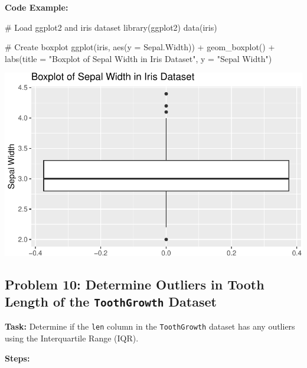 \documentclass[
  letterpaper,
  DIV=11,
  numbers=noendperiod]{scrreprt}
\newenvironment{Shaded}{\begin{snugshade}}{\end{snugshade}}
\newcommand{\AttributeTok}[1]{\textcolor[rgb]{0.40,0.45,0.13}{#1}}
\newcommand{\CommentTok}[1]{\textcolor[rgb]{0.37,0.37,0.37}{#1}}
\newcommand{\FunctionTok}[1]{\textcolor[rgb]{0.28,0.35,0.67}{#1}}
\newcommand{\NormalTok}[1]{\textcolor[rgb]{0.00,0.23,0.31}{#1}}
\newcommand{\SpecialCharTok}[1]{\textcolor[rgb]{0.37,0.37,0.37}{#1}}
\newcommand{\StringTok}[1]{\textcolor[rgb]{0.13,0.47,0.30}{#1}}
\begin{document}
\textbf{Code Example:}

\begin{Shaded}
\begin{Highlighting}[]
\CommentTok{\# Load ggplot2 and iris dataset}
\FunctionTok{library}\NormalTok{(ggplot2)}
\FunctionTok{data}\NormalTok{(iris)}

\CommentTok{\# Create boxplot}
\FunctionTok{ggplot}\NormalTok{(iris, }\FunctionTok{aes}\NormalTok{(}\AttributeTok{y =}\NormalTok{ Sepal.Width)) }\SpecialCharTok{+}
  \FunctionTok{geom\_boxplot}\NormalTok{() }\SpecialCharTok{+}
  \FunctionTok{labs}\NormalTok{(}\AttributeTok{title =} \StringTok{"Boxplot of Sepal Width in Iris Dataset"}\NormalTok{, }\AttributeTok{y =} \StringTok{"Sepal Width"}\NormalTok{)}
\end{Highlighting}
\end{Shaded}

\includegraphics{Measures_of_Variability_files/figure-pdf/unnamed-chunk-23-1.pdf}

\subsection*{\texorpdfstring{Problem 10: Determine Outliers in Tooth
Length of the \texttt{ToothGrowth}
Dataset}{Problem 10: Determine Outliers in Tooth Length of the ToothGrowth Dataset}}\label{problem-10-determine-outliers-in-tooth-length-of-the-toothgrowth-dataset}

\textbf{Task:} Determine if the \texttt{len} column in the
\texttt{ToothGrowth} dataset has any outliers using the Interquartile
Range (IQR).

\textbf{Steps:}
\end{document}
